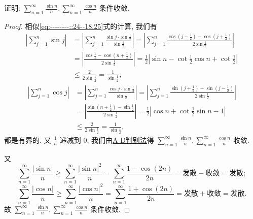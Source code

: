 \documentclass[../../main.tex]{subfiles}
\begin{document}
\begin{example}
证明: $\sum_{n=1}^{\infty} \frac{\sin n}{n}, \sum_{n=1}^{\infty} \frac{\cos n}{n}$ 条件收敛.
\end{example}
\begin{proof}
相似\eqref{eq:--------::24--18.25}式的计算, 我们有
\begin{align*}
\left| \sum_{j=1}^n{\sin j} \right|&=\left| \sum_{j=1}^n{\frac{\sin j\cdot \sin \frac{1}{2}}{\sin \frac{1}{2}}} \right|=\left| \sum_{j=1}^n{\frac{\cos \left( j-\frac{1}{2} \right) -\cos \left( j+\frac{1}{2} \right)}{2\sin \frac{1}{2}}} \right|
\\
&=\left| \frac{\cos \frac{1}{2}-\cos \left( n+\frac{1}{2} \right)}{2\sin \frac{1}{2}} \right|=\frac{1}{2}\left| \sin n-\cot \frac{1}{2}\cos n+\cot \frac{1}{2} \right|
\\
&\leqslant \frac{2}{2\sin \frac{1}{2}}=\frac{1}{\sin \frac{1}{2}},
\end{align*}
\begin{align*}
\left| \sum_{j=1}^n{\cos j} \right|&=\left| \sum_{j=1}^n{\frac{\cos j\cdot \sin \frac{1}{2}}{\sin \frac{1}{2}}} \right|=\left| \sum_{j=1}^n{\frac{\sin \left( j+\frac{1}{2} \right) -\sin \left( j-\frac{1}{2} \right)}{2\sin \frac{1}{2}}} \right|
\\
&=\left| \frac{\sin \left( n+\frac{1}{2} \right) -\sin \frac{1}{2}}{2\sin \frac{1}{2}} \right|=\frac{1}{2}\left| \cos n+\cot \frac{1}{2}\sin n-1 \right|
\\
&\leqslant \frac{2}{2\sin \frac{1}{2}}=\frac{1}{\sin \frac{1}{2}},
\end{align*}
都是有界的. 又 $\frac{1}{n}$ 递减到 0, 我们由\hyperref[theorem:A-D判别法]{A-D判别法}得 $\sum_{n=1}^{\infty} \frac{\sin n}{n}, \sum_{n=1}^{\infty} \frac{\cos n}{n}$ 收敛.

又
\[
\sum_{n=1}^{\infty} \frac{|\sin n|}{n} \geqslant \sum_{n=1}^{\infty} \frac{|\sin n|^2}{n} = \sum_{n=1}^{\infty} \frac{1 - \cos (2n)}{2n} = \text{发散} - \text{收敛} = \text{发散};
\]
\[
\sum_{n=1}^{\infty} \frac{|\cos n|}{n} \geqslant \sum_{n=1}^{\infty} \frac{|\cos n|^2}{n} = \sum_{n=1}^{\infty} \frac{1 + \cos (2n)}{2n} = \text{发散} + \text{收敛} = \text{发散}.
\]
故 $\sum_{n=1}^{\infty} \frac{\sin n}{n}, \sum_{n=1}^{\infty} \frac{\cos n}{n}$ 条件收敛.
\end{proof}
\end{document}
